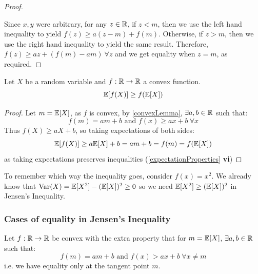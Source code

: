 \documentclass[../main.tex]{subfiles}
\begin{document}
\begin{proof}
\begin{center}
  \end{center}
  Since $x, y$ were arbitrary, for any $z \in \mathbb{R}$, if $z < m$, then we use the left hand inequality to yield $f(z) \geq a(z - m) + f(m)$.
  Otherwise, if $z > m$, then we use the right hand inequality to yield the same result.
  Therefore, $f(z) \geq az + (f(m) - am)\ \forall z$ and we get equality when $z = m$, as required.
\end{proof}
\begin{proposition}
  Let $X$ be a random variable and $f: \mathbb{R} \to \mathbb{R}$ a convex function. \label{jensensInequality}
  \[
    \mathbb{E}[f(X)] \geq f(\mathbb{E}[X])
  \]
\end{proposition}
\begin{proof}
  Let $m = \mathbb{E}[X]$, as $f$ is convex, by \cref{convexLemma}, $\exists a, b \in \mathbb{R}$ such that:
  \[
    f(m) = am + b \text{ and } f(x) \geq ax + b\ \forall x
  \]
  Thus $f(X) \geq aX + b$, so taking expectations of both sides:
  \[
    \mathbb{E}[f(X)] \geq a\mathbb{E}[X] + b = am + b = f(m) = f(\mathbb{E}[X])
  \]
  as taking expectations preserves inequalities (\cref{expectationProperties} \textbf{vi})
\end{proof}
\begin{remark}[Memorisation]
  To remember which way the inequality goes, consider $f(x) = x^2$.
  We already know that $\operatorname{Var}(X) = \mathbb{E}[X^2] - (\mathbb{E}[X])^2 \geq 0$ so we need $\mathbb{E}[X^2] \geq (\mathbb{E}[X])^2$ in Jensen's Inequality.
\end{remark}
\subsubsection{Cases of equality in Jensen's Inequality}
Let $f: \mathbb{R} \to \mathbb{R}$ be convex with the extra property that for $m = \mathbb{E}[X]$, $\exists a, b \in \mathbb{R}$ such that:
\[
  f(m) = am + b \text{ and } f(x) > ax + b\ \forall x \neq m
\]
i.e. we have equality only at the tangent point $m$.
\end{document}
